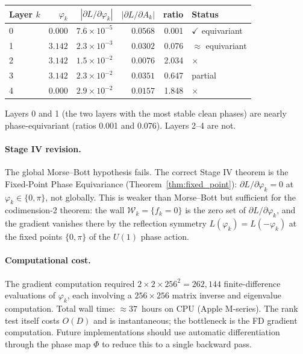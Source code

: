 \documentclass[11pt]{amsart}
\begin{document}
\begin{center}
\small
\begin{tabular}{@{}lrrrrl@{}}
\toprule
Layer $k$ & $\varphi_k$ & $|\partial L/\partial\varphi_k|$
         & $|\partial L/\partial A_k|$ & ratio & Status \\
\midrule
0 & $0.000$ & $7.6\times10^{-5}$ & $0.0568$ & 0.001 & $\checkmark$ equivariant \\
1 & $3.142$ & $2.3\times10^{-3}$ & $0.0302$ & 0.076 & $\approx$ equivariant \\
2 & $3.142$ & $1.5\times10^{-2}$ & $0.0076$ & 2.034 & $\times$ \\
3 & $3.142$ & $2.3\times10^{-2}$ & $0.0351$ & 0.647 & partial \\
4 & $0.000$ & $2.9\times10^{-2}$ & $0.0157$ & 1.848 & $\times$ \\
\bottomrule
\end{tabular}
\end{center}

Layers 0 and 1 (the two layers with the most stable clean phases)
are nearly phase-equivariant (ratios 0.001 and 0.076).
Layers 2--4 are not.

\paragraph{Stage IV revision.}
The global Morse--Bott hypothesis fails.
The correct Stage IV theorem is the Fixed-Point Phase Equivariance
(Theorem~\ref{thm:fixed_point}):
$\partial L/\partial\varphi_k = 0$ at $\varphi_k \in \{0,\pi\}$,
not globally.
This is weaker than Morse--Bott but sufficient for the codimension-2
theorem: the wall $\mathcal{W}_k = \{f_k = 0\}$ is the zero set of
$\partial L/\partial\varphi_k$, and the gradient vanishes there
by the reflection symmetry $L(\varphi_k) = L(-\varphi_k)$
at the fixed points $\{0,\pi\}$ of the $U(1)$ phase action.

\paragraph{Computational cost.}
The gradient computation required $2 \times 2 \times 256^2 = 262{,}144$
finite-difference evaluations of $\varphi_k$, each involving a
$256 \times 256$ matrix inverse and eigenvalue computation.
Total wall time: $\approx 37$~hours on CPU (Apple M-series).
The rank test itself costs $O(D)$ and is instantaneous;
the bottleneck is the FD gradient computation.
Future implementations should use automatic differentiation
through the phase map $\Phi$ to reduce this to a single backward pass.
\end{document}
